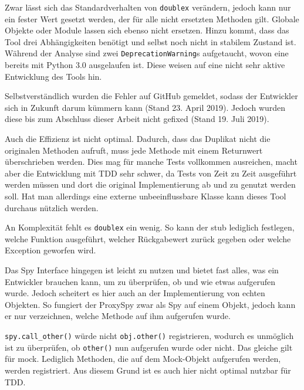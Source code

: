 Zwar lässt sich das Standardverhalten von \lstinline{doublex} verändern, jedoch
kann nur ein fester Wert gesetzt werden, der für alle nicht ersetzten Methoden
gilt. Globale Objekte oder Module lassen sich ebenso nicht ersetzen. Hinzu 
kommt, dass das Tool drei Abhängigkeiten benötigt und selbst noch nicht in 
stabilem Zustand ist. Während der Analyse sind zwei 
\lstinline{DeprecationWarning}s aufgetaucht, wovon eine bereits mit Python 3.0 
ausgelaufen ist. Diese weisen auf eine nicht sehr aktive Entwicklung des Tools 
hin.

Selbstverständlich wurden die Fehler auf GitHub gemeldet, sodass der Entwickler
sich in Zukunft darum kümmern kann (Stand 23. April 2019). Jedoch wurden diese 
bis zum Abschluss dieser Arbeit nicht gefixed (Stand 19. Juli 2019).

Auch die Effizienz ist nicht optimal. Dadurch, dass das Duplikat nicht die
originalen Methoden aufruft, muss jede Methode mit einem Returnwert
überschrieben werden. Dies mag für manche Tests vollkommen ausreichen, macht
aber die Entwicklung mit TDD sehr schwer, da Tests von Zeit zu Zeit ausgeführt
werden müssen und dort die original Implementierung ab und zu genutzt
werden soll. Hat man allerdings eine externe unbeeinflussbare Klasse
kann dieses Tool durchaus nützlich werden.

An Komplexität fehlt es \lstinline{doublex} ein wenig. So kann der \Gls{stub}
lediglich festlegen, welche Funktion ausgeführt, welcher Rückgabewert zurück
gegeben oder welche Exception geworfen wird.

Das Spy Interface hingegen ist leicht zu nutzen und bietet fast alles, was ein
Entwickler brauchen kann, um zu überprüfen, ob und wie etwas aufgerufen wurde.
Jedoch scheitert es hier auch an der Implementierung von echten Objekten. So
fungiert der ProxySpy zwar als Spy auf einem Objekt, jedoch kann er nur
verzeichnen, welche Methode auf ihm aufgerufen wurde.

\lstinline{spy.call_other()} würde nicht \lstinline{obj.other()} registrieren,
wodurch es unmöglich ist zu überprüfen, ob \lstinline{other()} nun aufgerufen
wurde oder nicht. Das gleiche gilt für \Gls{mock}. Lediglich Methoden, die auf
dem Mock-Objekt aufgerufen werden, werden registriert. Aus diesem Grund ist es
auch hier nicht optimal nutzbar für TDD.